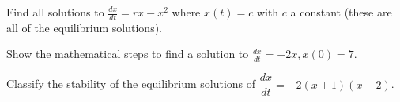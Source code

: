 \documentclass[12pt,letterpaper,noanswers]{exam}
\begin{document}
 \pdfpageheight 11in 
  \pdfpagewidth 8.5in



\begin{questions}
\question Find all solutions to $\frac{dx}{dt} = r x - x^2$ where $x(t) = c$ with $c$ a constant (these are all of the equilibrium solutions).

\vfill

\item 
Show the mathematical steps to find a solution to $\frac{dx}{dt} = -2x, x(0) = 7$.

\vfill

\question Classify the stability of the equilibrium solutions of $\dfrac{dx}{dt} = -2(x+1)(x-2)$.

\vfill

\end{questions}
\end{document}
